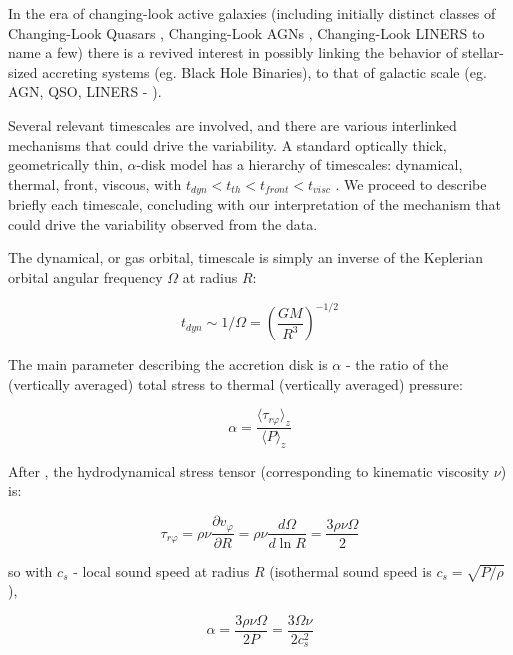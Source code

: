 \documentclass[twocolumn]{aastex62}
\begin{document}
In the era of changing-look active galaxies (including initially distinct classes of Changing-Look Quasars \citep{lamassa2015, macleod2019}, Changing-Look AGNs \citep{marchese2012, bianchi2009,risaliti2009}, Changing-Look LINERS \citep{frederick2019} to name a few) there is a revived interest in possibly linking the behavior of stellar-sized accreting systems (eg. Black Hole Binaries),  to that of galactic scale (eg. AGN, QSO, LINERS  - \citealt{noda2018, ruan2019}). 

Several relevant timescales are involved, and there are various interlinked mechanisms that could drive the variability. A standard optically thick, geometrically thin, $\alpha$-disk model has a hierarchy of timescales: dynamical, thermal, front, viscous, with   $t_{dyn} < t_{th} < t_{front}  < t_{visc} $ \citep{netzer2013, frank2002}. We proceed to describe briefly each timescale, concluding with our interpretation of the mechanism that could drive the variability observed from the data. 

The dynamical, or gas orbital, timescale is simply  an inverse of the Keplerian orbital angular frequency $ \Omega$  at radius $R$: 

\begin{equation}
t_{dyn} {\sim}  1 / \Omega = \left( \frac{GM}{R^{3}}\right)^{-1/2}
\end{equation}


The main parameter  describing the accretion disk is $\alpha$ - the ratio of the (vertically averaged) total stress to thermal (vertically averaged) pressure: 

\begin{equation}
\alpha= \frac{\langle \tau_{r\varphi}  \rangle_{z} }{\langle P \rangle _{z}} 
\end{equation}


After \cite{lasota2016},  the hydrodynamical stress tensor (corresponding to  kinematic viscosity $\nu$) is:

\begin{equation}
\tau_{r\varphi } = \rho \nu \frac{\partial v_{\varphi}}{\partial R} = \rho \nu \frac{d \Omega}{d \ln{R}} = \frac{3 \rho \nu \Omega}{2}  
\end{equation}

so  with  $c_{s}$ -  local sound speed at radius $R$ (isothermal sound speed is $c_{s} = \sqrt{P/\rho}$),

\begin{equation}
\alpha  =   \frac{3 \rho \nu \Omega}{2 P} =  \frac{3 \Omega \nu}{2 c_{s}^{2}}
\end{equation}
\end{document}
